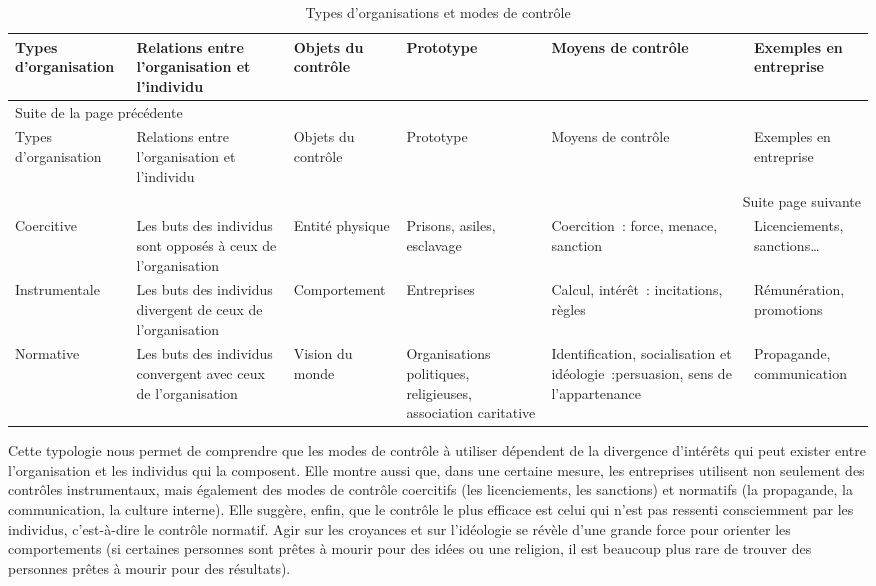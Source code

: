 \documentclass[oneside]{kaobook}
\begin{document}
{\footnotesize
\begin{longtable}{p{2cm} p{3cm} p{2cm} p{2cm} p{3cm} p{2cm}}
\caption{Types d'organisations et modes de contrôle}
\\
Types d'organisation & Relations entre l'organisation et l'individu & Objets du contrôle & Prototype & Moyens de contrôle & Exemples en entreprise\\
\hline
\endfirsthead
\multicolumn{6}{l}{Suite de la page précédente} \\
\hline

Types d'organisation & Relations entre l'organisation et l'individu & Objets du contrôle & Prototype & Moyens de contrôle & Exemples en entreprise \\

\hline
\endhead
\hline\multicolumn{6}{r}{Suite page suivante} \\
\endfoot
\endlastfoot
\hline
Coercitive & Les buts des individus sont opposés à ceux de l'organisation & Entité physique & Prisons, asiles, esclavage & Coercition : force, menace, sanction & Licenciements, sanctions\ldots{}\\
Instrumentale & Les buts des individus divergent de ceux de l'organisation & Comportement & Entreprises & Calcul, intérêt :  incitations, règles & Rémunération, promotions\\
Normative & Les buts des individus convergent avec ceux de l'organisation & Vision du monde & Organisations politiques, religieuses, association caritative & Identification, socialisation et idéologie :persuasion, sens de l'appartenance & Propagande, communication\\
\end{longtable}}

Cette typologie nous permet de comprendre que les modes de contrôle à utiliser dépendent de la divergence d'intérêts qui peut exister entre l'organisation et les individus qui la composent. Elle montre aussi que, dans une certaine mesure, les entreprises utilisent non seulement des contrôles instrumentaux, mais également des modes de contrôle coercitifs (les licenciements, les sanctions) et normatifs (la propagande, la communication, la culture interne). Elle suggère, enfin, que le contrôle le plus efficace est celui qui n'est pas ressenti consciemment par les individus, c'est-à-dire le contrôle normatif. Agir sur les croyances et sur l'idéologie se révèle d'une grande force pour orienter les comportements (si certaines personnes sont prêtes à mourir pour des idées ou une religion, il est beaucoup plus rare de trouver des personnes prêtes à mourir pour des résultats).
\end{document}
